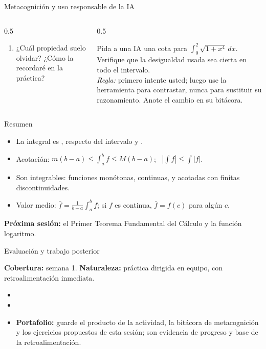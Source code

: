 \documentclass[10pt,aspectratio=169]{beamer}
\begin{document}
\begin{frame}{Metacognición y uso responsable de la IA}
  \small
  \begin{columns}[t]
    \begin{column}{0.5\textwidth}
      \begin{metacog}
        \begin{enumerate}
          \metacomun
          \item ¿Cuál propiedad suelo olvidar? ¿Cómo la recordaré en la práctica?
        \end{enumerate}
      \end{metacog}
    \end{column}
    \begin{column}{0.5\textwidth}
      \begin{iabox}
        Pida a una IA una cota para $\int_0^2\sqrt{1+x^4}\,dx$. Verifique que la desigualdad usada sea cierta en todo el intervalo.\\[2pt]
        \textit{Regla:} primero intente usted; luego use la herramienta para contrastar, nunca para sustituir su razonamiento. Anote el cambio en su bitácora.
      \end{iabox}
    \end{column}
  \end{columns}
\end{frame}

\begin{frame}{Resumen}
  \begin{itemize}
    \item La integral es ,  respecto del intervalo y .
    \item Acotación: $m(b-a)\le\int_a^bf\le M(b-a)$; \ $\left|\int f\right|\le\int|f|$.
    \item Son integrables: funciones monótonas, continuas, y acotadas con finitas discontinuidades.
    \item Valor medio: $\bar f=\frac{1}{b-a}\int_a^bf$; si $f$ es continua, $\bar f=f(c)$ para algún $c$.
  \end{itemize}
  \vspace{3mm}
  \textbf{Próxima sesión:} el Primer Teorema Fundamental del Cálculo y la función logaritmo.
\end{frame}


\begin{frame}{Evaluación y trabajo posterior}
  \small
  \begin{evalbox}
    \textbf{Cobertura:} semana 1. \textbf{Naturaleza:} práctica dirigida en equipo, con retroalimentación inmediata.
  \end{evalbox}
  \begin{itemize}
    \item \criterios
    \item \declaracionia
    \item \textbf{Portafolio:} guarde el producto de la actividad, la bitácora de metacognición y los ejercicios propuestos de esta sesión; son evidencia de progreso y base de la retroalimentación.
  \end{itemize}
\end{frame}
\end{document}
